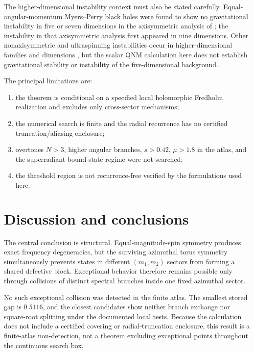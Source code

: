 \documentclass[10pt]{article}
\theoremstyle{plain}
\begin{document}
The higher-dimensional instability context must also be stated carefully.
Equal-angular-momentum Myers--Perry black holes were found to show no
gravitational instability in five or seven dimensions in the axisymmetric
analysis of \citet{dias2010}; the instability in that axisymmetric analysis
first appeared in nine dimensions. Other nonaxisymmetric and ultraspinning
instabilities occur in higher-dimensional families and dimensions
\citep{hartnett2013,emparan2014}, but the scalar QNM calculation here does not
establish gravitational stability or instability of the five-dimensional
background.

The principal limitations are:
\begin{enumerate}
\item the theorem is conditional on a specified local holomorphic Fredholm
  realization and excludes only cross-sector mechanisms;
\item the numerical search is finite and the radial recurrence has no certified
  truncation/aliasing enclosure;
\item overtones $N>3$, higher angular branches, $s>0.42$, $\mu>1.8$ in the
  atlas, and the superradiant bound-state regime were not searched;
\item the threshold region is not recurrence-free verified by the formulations
  used here.
\end{enumerate}

\section{Discussion and conclusions}

The central conclusion is structural. Equal-magnitude-spin symmetry produces
exact frequency degeneracies, but the surviving azimuthal torus symmetry
simultaneously prevents states in different $(m_1,m_2)$ sectors from forming a
shared defective block. Exceptional behavior therefore remains possible only
through collisions of distinct spectral branches inside one fixed azimuthal
sector.

No such exceptional collision was detected in the finite atlas. The smallest
stored gap is $0.5116$, and the closest candidates show neither branch exchange
nor square-root splitting under the documented local tests. Because the
calculation does not include a certified covering or radial-truncation
enclosure, this result is a finite-atlas non-detection, not a theorem excluding
exceptional points throughout the continuous search box.
\end{document}
